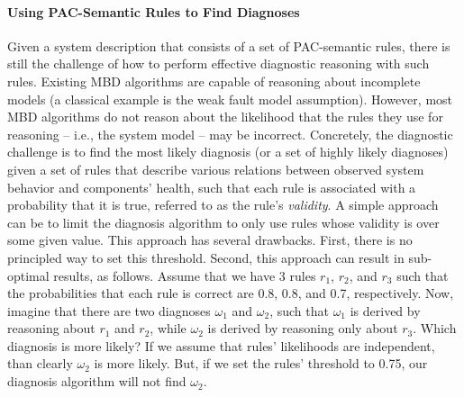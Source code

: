 \documentclass[12pt]{article}
\newcommand{\note}[1]{\textbf{\textit{#1}}}
\begin{document}


\paragraph{Using PAC-Semantic Rules to Find Diagnoses}
Given a system description that consists of a set of PAC-semantic rules, there is still the challenge 
of how to perform effective diagnostic reasoning with such rules. 
Existing MBD algorithms are capable of reasoning about incomplete models (a classical example is the weak fault model assumption). However, most MBD algorithms do not reason about the likelihood that the rules they use for reasoning -- i.e., the system model -- may be incorrect. 
Concretely, the diagnostic challenge is to find the most likely diagnosis (or a set of highly likely diagnoses) given a set of rules that describe various relations between observed system behavior and components' health, such that each rule is associated with a probability that it is true, referred to as the rule's {\em validity}. 
A simple approach can be to limit the diagnosis algorithm to only use rules whose validity is over some given value. This approach has several drawbacks. First, there is no principled way to set this threshold. Second, this approach can result in sub-optimal results, as follows. 
Assume that we have 3 rules $r_1$, $r_2$, and $r_3$ such that the probabilities that each rule is correct are 0.8, 0.8, and 0.7, respectively. 
Now, imagine that there are two diagnoses $\omega_1$ and $\omega_2$, such that $\omega_1$ is derived by reasoning about $r_1$ and $r_2$, while $\omega_2$ is derived by reasoning only about $r_3$. Which diagnosis is more likely? 
If we assume that rules' likelihoods are independent, than clearly $\omega_2$ is more likely. But, if we set the rules' threshold to 0.75, our diagnosis algorithm will not find $\omega_2$. 
\end{document}
